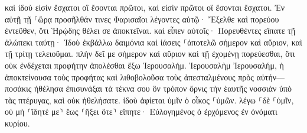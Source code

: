 \documentclass{openreader}
\begin{document}
καὶ ἰδοὺ εἰσὶν ἔσχατοι οἳ ἔσονται πρῶτοι, καὶ εἰσὶν πρῶτοι οἳ ἔσονται ἔσχατοι. 
Ἐν αὐτῇ τῇ ⸀ὥρᾳ προσῆλθάν τινες Φαρισαῖοι λέγοντες αὐτῷ· Ἔξελθε καὶ πορεύου ἐντεῦθεν, ὅτι Ἡρῴδης θέλει σε ἀποκτεῖναι. 
καὶ εἶπεν αὐτοῖς· Πορευθέντες εἴπατε τῇ ἀλώπεκι ταύτῃ· Ἰδοὺ ἐκβάλλω δαιμόνια καὶ ἰάσεις ⸀ἀποτελῶ σήμερον καὶ αὔριον, καὶ τῇ τρίτῃ τελειοῦμαι. 
πλὴν δεῖ με σήμερον καὶ αὔριον καὶ τῇ ἐχομένῃ πορεύεσθαι, ὅτι οὐκ ἐνδέχεται προφήτην ἀπολέσθαι ἔξω Ἰερουσαλήμ. 
Ἰερουσαλὴμ Ἰερουσαλήμ, ἡ ἀποκτείνουσα τοὺς προφήτας καὶ λιθοβολοῦσα τοὺς ἀπεσταλμένους πρὸς αὐτήν— ποσάκις ἠθέλησα ἐπισυνάξαι τὰ τέκνα σου ὃν τρόπον ὄρνις τὴν ἑαυτῆς νοσσιὰν ὑπὸ τὰς πτέρυγας, καὶ οὐκ ἠθελήσατε. 
ἰδοὺ ἀφίεται ὑμῖν ὁ οἶκος ⸀ὑμῶν. λέγω ⸀δὲ ⸀ὑμῖν, οὐ μὴ ⸂ἴδητέ με⸃ ἕως ⸂ἥξει ὅτε⸃ εἴπητε· Εὐλογημένος ὁ ἐρχόμενος ἐν ὀνόματι κυρίου. 
\end{document}
